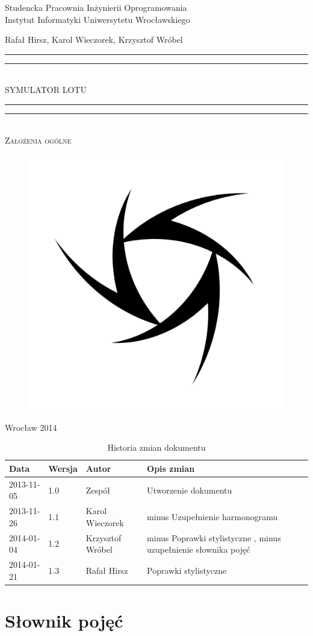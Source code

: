 \documentclass{mwrep}
\newcommand*{\titleGP}{\begingroup
\centering

{\large Studencka Pracownia Inżynierii Oprogramowania}\\Instytut Informatyki Uniwersytetu Wrocławskiego\par
\vspace*{16\baselineskip}

{\Large Rafał Hirsz, Karol Wieczorek, Krzysztof Wróbel\par}
\vspace*{\baselineskip}

\rule{\textwidth}{1.6pt}\vspace*{-\baselineskip}\vspace*{2pt}
\rule{\textwidth}{0.4pt}\\[\baselineskip]

{\Huge SYMULATOR LOTU}\\[0.2\baselineskip]

\rule{\textwidth}{0.4pt}\vspace*{-\baselineskip}\vspace{3.2pt}
\rule{\textwidth}{1.6pt}\\[\baselineskip]

\scshape
{\huge Założenia ogólne}\par
\vspace*{2\baselineskip}

\begin{figure}[h]
\centering
\includegraphics[width=5\baselineskip]{flightsim-team-logo.pdf}
\end{figure}
\vfill

{\large Wrocław 2014}\par

\pagebreak

\endgroup}
\newcommand{\fixedspaceword}[2][1]{%
  \begingroup
  \spaceskip=#1\fontdimen2\font minus \fontdimen4\font
  \xspaceskip=0pt\relax %
  #2%
  \endgroup
}
\begin{document}
\thispagestyle{empty}
\titleGP

\begin{center}
\begin{table}[h]
\begin{center}
\caption{Historia zmian dokumentu}\label{T:Zmiany}
\vspace{3ex}
\begin{tabularx}{1\textwidth}{|l|l|l|X|}
\hline
Data & Wersja & Autor & Opis zmian \\ \hline
2013-11-05 & 1.0 & Zespół & Utworzenie dokumentu \\
2013-11-26 & 1.1 & Karol Wieczorek & \fixedspaceword{Uzupełnienie harmonogramu} \\
2014-01-04 & 1.2 & Krzysztof Wróbel & \fixedspaceword{Poprawki stylistyczne}, \fixedspaceword{uzupełnienie słownika pojęć} \\
2014-01-21 & 1.3 & Rafał Hirsz & Poprawki stylistyczne \\
\hline
\end{tabularx}
\end{center}
\end{table}
\end{center}

\pagebreak

\tableofcontents

\chapter{Słownik pojęć\protect\footnotemark[1]{}}

\end{document}
